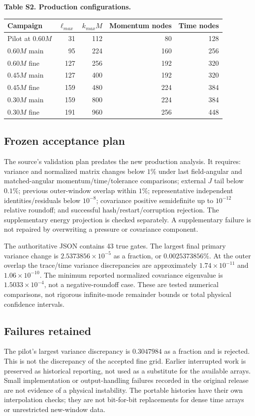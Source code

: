 \documentclass[10pt]{article}
\begin{document}
\begin{center}
\textbf{Table S2. Production configurations.}\\[4pt]
\begin{tabular}{@{}lrrrr@{}}\toprule
Campaign & $\ell_{max}$ & $k_{max}M$ & Momentum nodes & Time nodes\\\midrule
Pilot at $0.60M$ &31&112&80&128\\
$0.60M$ main &95&224&160&256\\
$0.60M$ fine &127&256&192&320\\
$0.45M$ main &127&400&192&320\\
$0.45M$ fine &159&480&224&384\\
$0.30M$ main &159&800&224&384\\
$0.30M$ fine &191&960&256&448\\\bottomrule
\end{tabular}
\end{center}

\subsection{Frozen acceptance plan}
The source's validation plan predates the new production analysis. It requires: variance and normalized matrix changes below $1\%$ under last field-angular and matched-angular momentum/time/tolerance comparisons; external $J$ tail below $0.1\%$; previous outer-window overlap within $1\%$; representative independent identities/residuals below $10^{-8}$; covariance positive semidefinite up to $10^{-12}$ relative roundoff; and successful hash/restart/corruption rejection. The supplementary energy projection is checked separately. A supplementary failure is not repaired by overwriting a pressure or covariance component.

The authoritative JSON contains 43 true gates. The largest final primary variance change is $2.5373856\times10^{-5}$ as a fraction, or $0.0025373856\%$. At the outer overlap the trace/time variance discrepancies are approximately $1.74\times10^{-11}$ and $1.06\times10^{-10}$. The minimum reported normalized covariance eigenvalue is $1.5033\times10^{-4}$, not a negative-roundoff case. These are tested numerical comparisons, not rigorous infinite-mode remainder bounds or total physical confidence intervals.

\subsection{Failures retained}
The pilot's largest variance discrepancy is $0.3047984$ as a fraction and is rejected. This is not the discrepancy of the accepted fine grid. Earlier interrupted work is preserved as historical reporting, not used as a substitute for the available arrays. Small implementation or output-handling failures recorded in the original release are not evidence of a physical instability. The portable histories have their own interpolation checks; they are not bit-for-bit replacements for dense time arrays or unrestricted new-window data.
\end{document}
